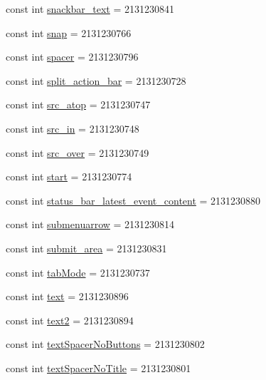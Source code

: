 \begin{CompactItemize}
const int \hyperlink{class__2doo_1_1_droid_1_1_resource_1_1_id_6b811559ea852a960b5c610816d2213f}{snackbar\_\-text} = 2131230841
\item 
const int \hyperlink{class__2doo_1_1_droid_1_1_resource_1_1_id_1ad45a730ff718de6304b52e87229820}{snap} = 2131230766
\item 
const int \hyperlink{class__2doo_1_1_droid_1_1_resource_1_1_id_b4aa993a7918b53e18a51bfe3a749fa2}{spacer} = 2131230796
\item 
const int \hyperlink{class__2doo_1_1_droid_1_1_resource_1_1_id_71290cbe138eca425ff897eee2097263}{split\_\-action\_\-bar} = 2131230728
\item 
const int \hyperlink{class__2doo_1_1_droid_1_1_resource_1_1_id_9232aa18efff43d491fb15961f954844}{src\_\-atop} = 2131230747
\item 
const int \hyperlink{class__2doo_1_1_droid_1_1_resource_1_1_id_fe20314086e82567e02e66a0ffbcefa3}{src\_\-in} = 2131230748
\item 
const int \hyperlink{class__2doo_1_1_droid_1_1_resource_1_1_id_1397aab88a1845ab4d5fa7a40de1199b}{src\_\-over} = 2131230749
\item 
const int \hyperlink{class__2doo_1_1_droid_1_1_resource_1_1_id_7c4035b58ac60d9d7d77b516f7bc48ef}{start} = 2131230774
\item 
const int \hyperlink{class__2doo_1_1_droid_1_1_resource_1_1_id_69d4e89e42da87cb4c417d8054f1caf5}{status\_\-bar\_\-latest\_\-event\_\-content} = 2131230880
\item 
const int \hyperlink{class__2doo_1_1_droid_1_1_resource_1_1_id_b3ad34b0abf8996363cd098790a6a7f2}{submenuarrow} = 2131230814
\item 
const int \hyperlink{class__2doo_1_1_droid_1_1_resource_1_1_id_49abf8eaeb6186f932f39bad99ecd834}{submit\_\-area} = 2131230831
\item 
const int \hyperlink{class__2doo_1_1_droid_1_1_resource_1_1_id_d74d5176237047d4715fc38da6a55542}{tabMode} = 2131230737
\item 
const int \hyperlink{class__2doo_1_1_droid_1_1_resource_1_1_id_91e9a1bbe4abf20953ff3b84eded2def}{text} = 2131230896
\item 
const int \hyperlink{class__2doo_1_1_droid_1_1_resource_1_1_id_b768de86486881283f57695095b5747a}{text2} = 2131230894
\item 
const int \hyperlink{class__2doo_1_1_droid_1_1_resource_1_1_id_6ddd61e12da56845cd908ed1ed897dc3}{textSpacerNoButtons} = 2131230802
\item 
const int \hyperlink{class__2doo_1_1_droid_1_1_resource_1_1_id_33d42f79b796eb8b8f70bf66458d3347}{textSpacerNoTitle} = 2131230801

\end{CompactItemize}
